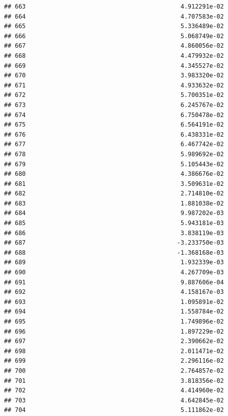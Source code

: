 \documentclass[
]{article}
\begin{document}
\begin{verbatim}
## 663                                           4.912291e-02
## 664                                           4.707583e-02
## 665                                           5.336489e-02
## 666                                           5.068749e-02
## 667                                           4.860056e-02
## 668                                           4.479932e-02
## 669                                           4.345527e-02
## 670                                           3.983320e-02
## 671                                           4.933632e-02
## 672                                           5.700351e-02
## 673                                           6.245767e-02
## 674                                           6.750478e-02
## 675                                           6.564191e-02
## 676                                           6.438331e-02
## 677                                           6.467742e-02
## 678                                           5.989692e-02
## 679                                           5.105443e-02
## 680                                           4.386676e-02
## 681                                           3.509631e-02
## 682                                           2.714810e-02
## 683                                           1.881038e-02
## 684                                           9.987202e-03
## 685                                           5.943181e-03
## 686                                           3.838119e-03
## 687                                          -3.233750e-03
## 688                                          -1.368168e-03
## 689                                           1.932339e-03
## 690                                           4.267709e-03
## 691                                           9.887606e-04
## 692                                           4.158167e-03
## 693                                           1.095891e-02
## 694                                           1.558784e-02
## 695                                           1.749896e-02
## 696                                           1.897229e-02
## 697                                           2.390662e-02
## 698                                           2.011471e-02
## 699                                           2.296116e-02
## 700                                           2.764857e-02
## 701                                           3.818356e-02
## 702                                           4.414960e-02
## 703                                           4.642845e-02
## 704                                           5.111862e-02

\end{verbatim}
\end{document}
